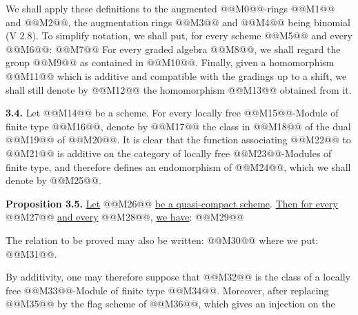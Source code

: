We shall apply these definitions to the augmented @@M0@@-rings @@M1@@ and @@M2@@, the augmentation rings @@M3@@ and @@M4@@ being binomial (V 2.8). To simplify notation, we shall put, for every scheme @@M5@@ and every @@M6@@:
@@M7@@
For every graded algebra @@M8@@, we shall regard the group @@M9@@ as contained in @@M10@@. Finally, given a homomorphism @@M11@@ which is additive and compatible with the gradings up to a shift, we shall still denote by @@M12@@ the homomorphism @@M13@@ obtained from it.

\textbf{3.4.} Let @@M14@@ be a scheme. For every locally free @@M15@@-Module of finite type @@M16@@, denote by @@M17@@ the class in @@M18@@ of the dual @@M19@@ of @@M20@@. It is clear that the function associating @@M22@@ to @@M21@@ is additive on the category of locally free @@M23@@-Modules of finite type, and therefore defines an endomorphism of @@M24@@, which we shall denote by @@M25@@.

\textbf{Proposition 3.5.} \uline{Let} @@M26@@ \uline{be a quasi-compact scheme}. \uline{Then for every} @@M27@@ \uline{and every} @@M28@@, \uline{we have}:
@@M29@@

The relation to be proved may also be written:
@@M30@@
where we put: @@M31@@.

By additivity, one may therefore suppose that @@M32@@ is the class of a locally free @@M33@@-Module of finite type @@M34@@. Moreover, after replacing @@M35@@ by the flag scheme of @@M36@@, which gives an injection on the
